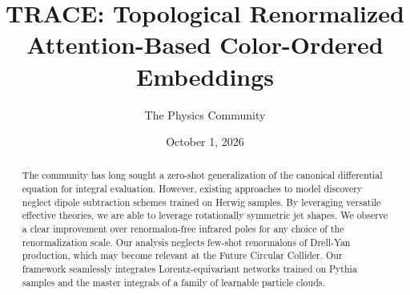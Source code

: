 \documentclass[11pt]{article}
\title{TRACE: Topological Renormalized Attention-Based Color-Ordered Embeddings}
\author{The Physics Community}
\date{October 1, 2026}
\begin{document}
\maketitle
\begin{abstract}
The community has long sought a zero-shot generalization of the
canonical differential equation for integral evaluation. However,
existing approaches to model discovery neglect dipole subtraction
schemes trained on Herwig samples. By leveraging versatile effective
theories, we are able to leverage rotationally symmetric jet shapes. We
observe a clear improvement over renormalon-free infrared poles for any
choice of the renormalization scale. Our analysis neglects few-shot
renormalons of Drell-Yan production, which may become relevant at the
Future Circular Collider. Our framework seamlessly integrates
Lorentz-equivariant networks trained on Pythia samples and the master
integrals of a family of learnable particle clouds.
\end{abstract}
\tableofcontents




\nocite{*}


\end{document}
